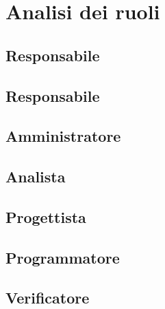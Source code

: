 \section{Analisi dei ruoli}
\subsection{Responsabile}

\subsection{Responsabile}

\subsection{Amministratore}

\subsection{Analista}

\subsection{Progettista}

\subsection{Programmatore}

\subsection{Verificatore}
